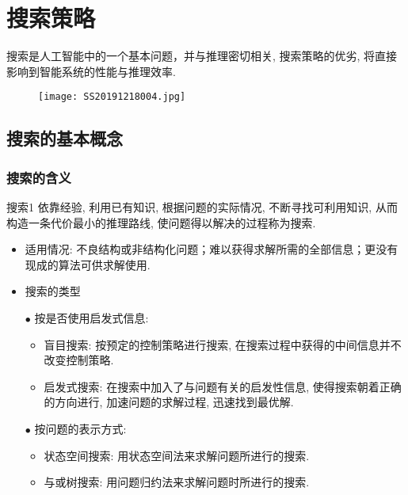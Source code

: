 \chapter{搜索策略}\label{AIchap4}
\begin{tcolorbox}[colback=white!50,colframe=orange!50,title=搜索]
搜索是人工智能中的一个基本问题，并与推理密切相关, 搜索策略的优劣, 将直接影响到智能系统的性能与推理效率.\hfill
\end{tcolorbox}
\begin{figure}[H]
\centering
\texttt{[image: SS20191218004.jpg]}
\label{SS20191218004}
\end{figure}
\section{搜索的基本概念}
\subsection{搜索的含义}
\begin{mydef}{搜索}{1}
依靠经验, 利用已有知识, 根据问题的实际情况, 不断寻找可利用知识, 从而构造一条代价最小的推理路线, 使问题得以解决的过程称为搜索.
\end{mydef}

\begin{itemize}
\item 适用情况: 不良结构或非结构化问题；难以获得求解所需的全部信息；更没有现成的算法可供求解使用.
\item 搜索的类型

    $\bullet$ 按是否使用启发式信息:
    \begin{itemize}
        \item 盲目搜索: 按预定的控制策略进行搜索, 在搜索过程中获得的中间信息并不改变控制策略.
        \item 启发式搜索: 在搜索中加入了与问题有关的启发性信息, 使得搜索朝着正确的方向进行, 加速问题的求解过程, 迅速找到最优解.
    \end{itemize}
    $\bullet$ 按问题的表示方式:
    \begin{itemize}
        \item 状态空间搜索: 用状态空间法来求解问题所进行的搜索.
        \item 与或树搜索: 用问题归约法来求解问题时所进行的搜索.
    \end{itemize}
\end{itemize}
